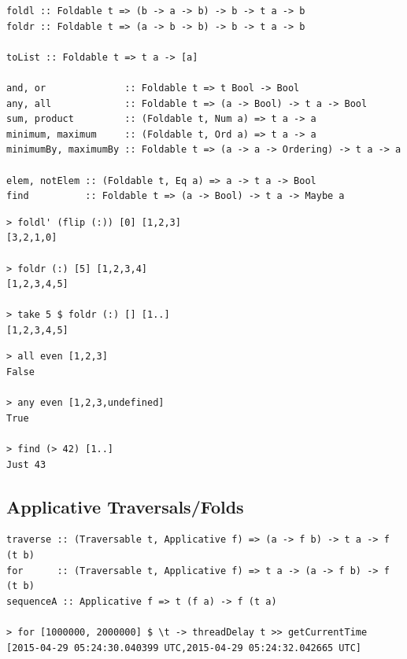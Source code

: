 \begin{box1}
\begin{multicols}{4}
\end{multicols}

\begin{verbatim}
foldl :: Foldable t => (b -> a -> b) -> b -> t a -> b	
foldr :: Foldable t => (a -> b -> b) -> b -> t a -> b	

toList :: Foldable t => t a -> [a]	

and, or              :: Foldable t => t Bool -> Bool	
any, all             :: Foldable t => (a -> Bool) -> t a -> Bool	
sum, product         :: (Foldable t, Num a) => t a -> a	
minimum, maximum     :: (Foldable t, Ord a) => t a -> a	
minimumBy, maximumBy :: Foldable t => (a -> a -> Ordering) -> t a -> a

elem, notElem :: (Foldable t, Eq a) => a -> t a -> Bool	
find          :: Foldable t => (a -> Bool) -> t a -> Maybe a
\end{verbatim}

\begin{multicols}{2}
\begin{verbatim}
> foldl' (flip (:)) [0] [1,2,3]
[3,2,1,0]

> foldr (:) [5] [1,2,3,4]
[1,2,3,4,5]

> take 5 $ foldr (:) [] [1..]
[1,2,3,4,5]
\end{verbatim}

\columnbreak

\begin{verbatim}
> all even [1,2,3]
False

> any even [1,2,3,undefined]
True

> find (> 42) [1..]
Just 43
\end{verbatim}
\end{multicols}
\end{box1}

\begin{box2}
\subsection *{Applicative Traversals/Folds}

\begin{verbatim}
traverse :: (Traversable t, Applicative f) => (a -> f b) -> t a -> f (t b)
for      :: (Traversable t, Applicative f) => t a -> (a -> f b) -> f (t b)
sequenceA :: Applicative f => t (f a) -> f (t a)

> for [1000000, 2000000] $ \t -> threadDelay t >> getCurrentTime
[2015-04-29 05:24:30.040399 UTC,2015-04-29 05:24:32.042665 UTC]
\end{verbatim}
\end{box2}


